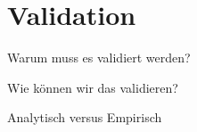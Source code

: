 \chapter{Validation}

Warum muss es validiert werden?

Wie können wir das validieren?

Analytisch versus Empirisch